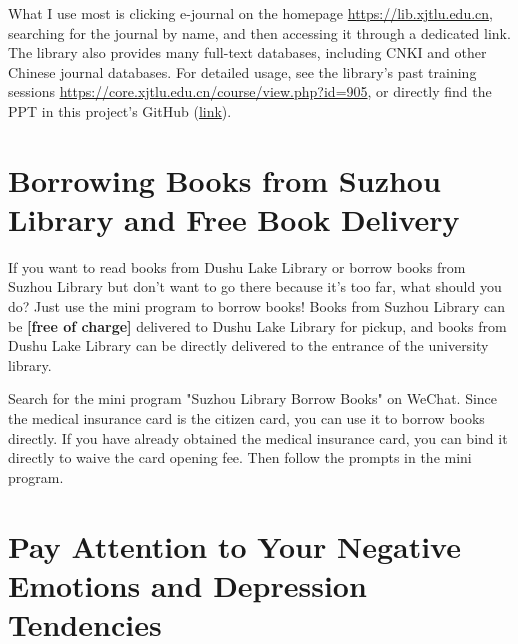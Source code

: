 What I use most is clicking e-journal on the homepage \url{https://lib.xjtlu.edu.cn}, searching for the journal by name, and then accessing it through a dedicated link. The library also provides many full-text databases, including CNKI and other Chinese journal databases. For detailed usage, see the library's past training sessions \url{https://core.xjtlu.edu.cn/course/view.php?id=905}, or directly find the PPT in this project's GitHub (\href{https://github.com/xp-pgrs-unofficial-guide/xp_pgrs_unofficial_guide/tree/main/fileshare}{link}).

\section{Borrowing Books from Suzhou Library and Free Book Delivery}
If you want to read books from Dushu Lake Library or borrow books from Suzhou Library but don't want to go there because it's too far, what should you do? Just use the mini program to borrow books! Books from Suzhou Library can be \textbf{[free of charge]} delivered to Dushu Lake Library for pickup, and books from Dushu Lake Library can be directly delivered to the entrance of the university library.

Search for the mini program "Suzhou Library Borrow Books" on WeChat. Since the medical insurance card is the citizen card, you can use it to borrow books directly. If you have already obtained the medical insurance card, you can bind it directly to waive the card opening fee. Then follow the prompts in the mini program.

\section{Pay Attention to Your Negative Emotions and Depression Tendencies}
\label{sec.mental_health}

